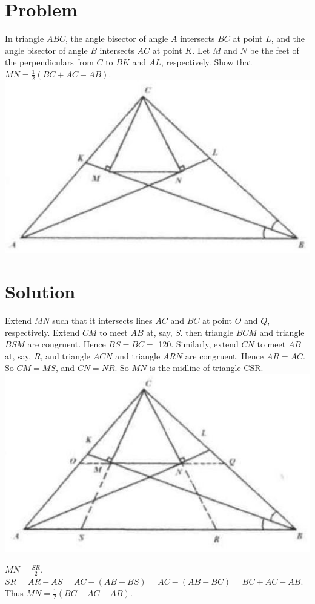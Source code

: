 \documentclass{article}
\begin{document}
\section*{Problem}
In triangle \(A B C\), the angle bisector of angle \(A\) intersects \(B C\) at point \(L\), and the angle bisector of angle \(B\) intersects \(A C\) at point \(K\). Let \(M\) and \(N\) be the feet of the perpendiculars from \(C\) to \(B K\) and \(A L\), respectively. Show that \(M N=\frac{1}{2}(B C+A C-A B)\).\\
\centering
\includegraphics[width=\textwidth]{images/065.jpg}

\section*{Solution}
Extend \(M N\) such that it intersects lines \(A C\) and \(B C\) at point \(O\) and \(Q\), respectively. Extend \(C M\) to meet \(A B\) at, say, \(S\). then triangle \(B C M\) and triangle \(B S M\) are congruent. Hence \(B S=B C=\) 120. Similarly, extend \(C N\) to meet \(A B\) at, say, \(R\), and triangle \(A C N\) and triangle \(A R N\) are congruent. Hence \(A R=A C\). So \(C M=M S\), and \(C N=N R\). So \(M N\) is the midline of triangle CSR.\\
\centering
\includegraphics[width=\textwidth]{images/069(2).jpg}


\(M N=\frac{S R}{2}\).\\
\(S R=A R-A S=A C-(A B-B S)=A C-(A B-B C)=B C+A C-A B\).\\
Thus \(M N=\frac{1}{2}(B C+A C-A B)\).
\end{document}
